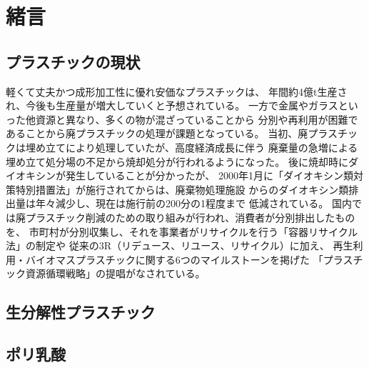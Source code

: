\section{緒言}
\subsection{プラスチックの現状}
軽くて丈夫かつ成形加工性に優れ安価なプラスチックは、
年間約4億t生産され、今後も生産量が増大していくと予想されている。
一方で金属やガラスといった他資源と異なり、多くの物が混ざっていることから
分別や再利用が困難であることから廃プラスチックの処理が課題となっている。
当初、廃プラスチックは埋め立てにより処理していたが、高度経済成長に伴う
廃棄量の急増による埋め立て処分場の不足から焼却処分が行われるようになった。
後に焼却時にダイオキシンが発生していることが分かったが、
2000年1月に「ダイオキシン類対策特別措置法」が施行されてからは、廃棄物処理施設
からのダイオキシン類排出量は年々減少し、現在は施行前の200分の1程度まで
低減されている。
国内では廃プラスチック削減のための取り組みが行われ、消費者が分別排出したものを、
市町村が分別収集し、それを事業者がリサイクルを行う「容器リサイクル法」の制定や
従来の3R（リデュース、リユース、リサイクル）に加え、
再生利用・バイオマスプラスチックに関する6つのマイルストーンを掲げた
「プラスチック資源循環戦略」の提唱がなされている。

\subsection{生分解性プラスチック}

\subsection{ポリ乳酸}
